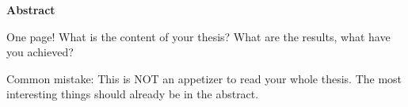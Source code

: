 

\clearemptydoublepage
{}
{}	

\vspace*{2cm}
\begin{center}
{\Large \bf Abstract}
\end{center}
\vspace{1cm}

One page!
What is the content of your thesis? What are the results, what have you achieved?

Common mistake:
This is NOT an appetizer to read your whole thesis. The most interesting things should already be in the abstract.